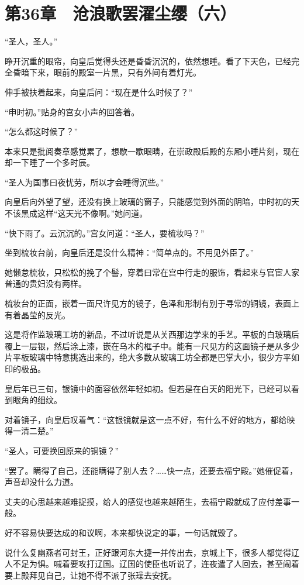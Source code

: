 \section{第36章　沧浪歌罢濯尘缨（六）}

“圣人，圣人。”

睁开沉重的眼帘，向皇后觉得头还是昏昏沉沉的，依然想睡。看了下天色，已经完全昏暗下来，眼前的殿室一片黑，只有外间有着灯光。

伸手被扶着起来，向皇后问：“现在是什么时候了？”

“申时初。”贴身的宫女小声的回答着。

“怎么都这时候了？”

本来只是批阅奏章感觉累了，想歇一歇眼睛，在崇政殿后殿的东厢小睡片刻，现在却一下睡了一个多时辰。

“圣人为国事曰夜忧劳，所以才会睡得沉些。”

向皇后向外望了望，还没有换上玻璃的窗子，只能感觉到外面的阴暗，申时初的天不该黑成这样“这天光不像啊。”她问道。

“快下雨了。云沉沉的。”宫女问道：“圣人，要梳妆吗？”

坐到梳妆台前，向皇后还是没什么精神：“简单点的。不用见外臣了。”

她懒怠梳妆，只松松的挽了个髻，穿着曰常在宫中行走的服饰，看起来与官宦人家普通的贵妇没有两样。

梳妆台的正面，嵌着一面尺许见方的镜子，色泽和形制有别于寻常的铜镜，表面上有着晶莹的反光。

这是将作监玻璃工坊的新品，不过听说是从关西那边学来的手艺。平板的白玻璃后覆上一层银，然后涂上漆，嵌在乌木的框子中。能有一尺见方的这面镜子是从多少片平板玻璃中特意挑选出来的，绝大多数从玻璃工坊全都是巴掌大小，很少方平如印的极品。

皇后年已三旬，银镜中的面容依然年轻如初。但若是在白天的阳光下，已经可以看到眼角的细纹。

对着镜子，向皇后叹着气：“这银镜就是这一点不好，有什么不好的地方，都给映得一清二楚。”

“圣人，可要换回原来的铜镜？”

“罢了。瞒得了自己，还能瞒得了别人去？……快一点，还要去福宁殿。”她催促着，声音却没什么力道。

丈夫的心思越来越难捉摸，给人的感觉也越来越陌生，去福宁殿就成了应付差事一般。

好不容易快要达成的和议啊，本来都快说定的事，一句话就毁了。

说什么复幽燕者可封王，正好跟河东大捷一并传出去，京城上下，很多人都觉得辽人不足为惧。喊着要攻打辽国。辽国的使臣也听说了，连夜遣了人回去，甚至闹着要上殿拜见自己，让她不得不派了张璪去安抚。

